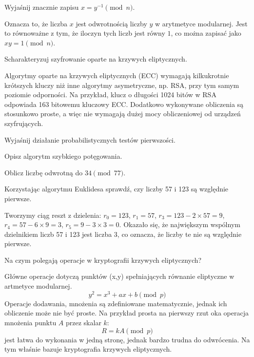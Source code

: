\documentclass[answers,11pt]{exam}
\begin{document}
\begin{questions}
\question Wyjaśnij znacznie zapisu $x = y^{-1} \pmod{n}$.
\begin{solution}
Oznacza to, że liczba $x$ jest odwrotnością liczby $y$ w arytmetyce modularnej. Jest to równoważne z tym, że iloczyn tych liczb jest równy $1$, co można zapisać jako $x y = 1 \pmod{n}$.
\end{solution}

\question Scharakteryzuj szyfrowanie oparte na krzywych eliptycznych.
\begin{solution}
Algorytmy oparte na krzywych eliptycznych (ECC) wymagają kilkukrotnie krótszych kluczy niż inne algorytmy asymetryczne, np. RSA, przy tym samym poziomie odporności. Na przykład, klucz o długości 1024 bitów w RSA odpowiada 163 bitowemu kluczowy ECC.
Dodatkowo wykonywane obliczenia są stosunkowo proste, a więc nie wymagają dużej mocy obliczeniowej od urządzeń szyfrujących.
\end{solution}

\question Wyjaśnij działanie probabilistycznych testów pierwszości.

\question Opisz algorytm szybkiego potęgowania.

\question Oblicz liczbę odwrotną do $34 \pmod{77}$.

\question Korzystając algorytmu Euklidesa sprawdź, czy liczby 57 i 123 są względnie pierwsze.
\begin{solution}
Tworzymy ciąg reszt z dzielenia:
$r_0 = 123$, $r_1 = 57$, $r_3 = 123 - 2 \times 57 = 9$, $r_4 = 57 - 6 \times 9 = 3$, 
$r_5 = 9 - 3 \times 3 = 0$. Okazało się, że największym wspólnym dzielnikiem liczb 57 i 123 jest liczba 3, co oznacza, że liczby te nie są względnie pierwsze.
\end{solution}

\question Na czym polegają operacje w kryptografii krzywych eliptycznych?
\begin{solution}
Główne operacje dotyczą punktów (x,y) spełniających równanie eliptyczne w artmetyce modularnej. 
\begin{equation}
y^2 = x^3 + ax +b \pmod{p}
\end{equation}
Operacje dodawania, mnożenia są zdefiniowane matematycznie, jednak ich obliczenie może nie być proste. Na przykład prosta na pierwszy rzut oka operacja mnożenia punktu $A$ przez skalar $k$:
\begin{equation}
R = k A \pmod{p}
\end{equation}
jest łatwa do wykonania w jedną stronę, jednak bardzo trudna do odwrócenia. Na tym właśnie bazuje kryptografia krzywych eliptycznych.

\end{solution}


\end{questions}
\end{document}
